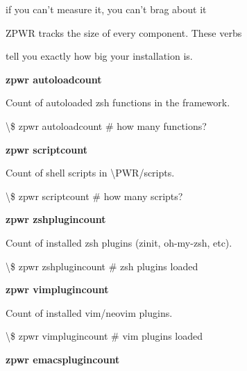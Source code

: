 \documentclass[11pt,a4paper,twoside]{book}
\begin{document}
if you can't measure it, you can't brag about it

ZPWR tracks the size of every component. These verbs

tell you exactly how big your installation is.


\vspace{12pt}
{\bfseries\color{neonyellow} zpwr autoloadcount}\vspace{4pt}

Count of autoloaded zsh functions in the framework.

\begin{codebox}
\textbackslash{}\$ zpwr autoloadcount           \# how many functions?\\
\end{codebox}


\vspace{12pt}
{\bfseries\color{neonyellow} zpwr scriptcount}\vspace{4pt}

Count of shell scripts in \textbackslash{}PWR/scripts.

\begin{codebox}
\textbackslash{}\$ zpwr scriptcount             \# how many scripts?\\
\end{codebox}


\vspace{12pt}
{\bfseries\color{neonyellow} zpwr zshplugincount}\vspace{4pt}

Count of installed zsh plugins (zinit, oh-my-zsh, etc).

\begin{codebox}
\textbackslash{}\$ zpwr zshplugincount          \# zsh plugins loaded\\
\end{codebox}


\vspace{12pt}
{\bfseries\color{neonyellow} zpwr vimplugincount}\vspace{4pt}

Count of installed vim/neovim plugins.

\begin{codebox}
\textbackslash{}\$ zpwr vimplugincount          \# vim plugins loaded\\
\end{codebox}


\vspace{12pt}
{\bfseries\color{neonyellow} zpwr emacsplugincount}\vspace{4pt}
\end{document}
